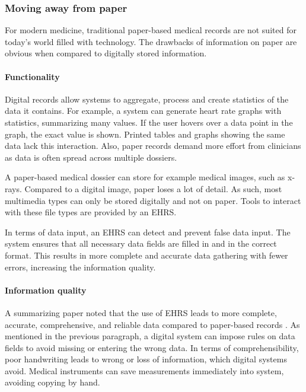         \subsubsection{Moving away from paper} \label{2_ehrs_paper}

        For modern medicine, traditional paper-based medical records are not suited for today's world filled with technology. The drawbacks of information on paper are obvious when compared to digitally stored information.

        \paragraph{Functionality} Digital records allow systems to aggregate, process and create statistics of the data it contains. For example, a system can generate heart rate graphs with statistics, summarizing many values. If the user hovers over a data point in the graph, the exact value is shown. Printed tables and graphs showing the same data lack this interaction. Also, paper records demand more effort from clinicians as data is often spread across multiple dossiers.

        A paper-based medical dossier can store for example medical images, such as x-rays. Compared to a digital image, paper loses a lot of detail. As such, most multimedia types can only be stored digitally and not on paper. Tools to interact with these file types are provided by an EHRS.

        In terms of data input, an EHRS can detect and prevent false data input. The system ensures that all necessary data fields are filled in and in the correct format. This results in more complete and accurate data gathering with fewer errors, increasing the information quality.

        \paragraph{Information quality} A summarizing paper noted that the use of EHRS leads to more complete, accurate, comprehensive, and reliable data compared to paper-based records \cite{ehrs_summary}. As mentioned in the previous paragraph, a digital system can impose rules on data fields to avoid missing or entering the wrong data. In terms of comprehensibility, poor handwriting leads to wrong or loss of information, which digital systems avoid. Medical instruments can save measurements immediately into system, avoiding copying by hand.

